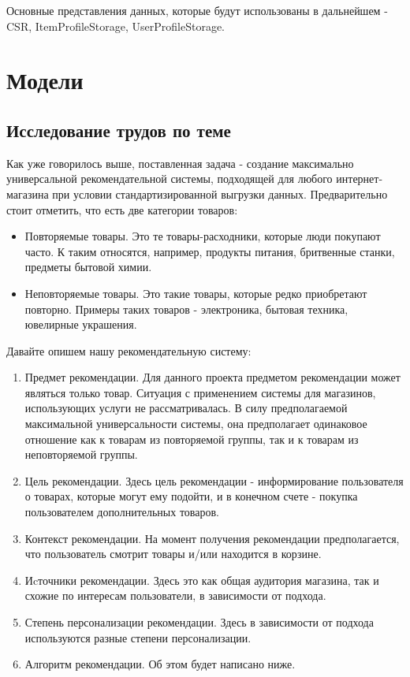 \documentclass[14pt]{mmcs_article}
\begin{document}
Основные представления данных, которые будут использованы в дальнейшем - CSR, ItemProfileStorage, UserProfileStorage.



\section{Модели}\label{dsfs}
\subsection{Исследование трудов по теме}
Как уже говорилось выше, поставленная задача - создание максимально универсальной рекомендательной системы, подходящей для любого интернет-магазина при условии стандартизированной выгрузки данных.
Предварительно стоит отметить, что есть две категории товаров:
\begin{itemize}
	\item Повторяемые товары. Это те товары-расходники, которые люди покупают часто. К таким относятся, например, продукты питания, бритвенные станки, предметы бытовой химии.
	\item  Неповторяемые товары. Это такие товары, которые редко приобретают повторно. Примеры таких товаров - электроника, бытовая техника, ювелирные украшения.
\end{itemize}
Давайте опишем нашу рекомендательную систему:
\begin{enumerate}
\item Предмет рекомендации. Для данного проекта предметом рекомендации может являться только товар. Ситуация с применением системы для магазинов, использующих услуги не рассматривалась. В силу предполагаемой максимальной универсальности системы, она предполагает одинаковое отношение как к товарам из повторяемой группы, так и к товарам из неповторяемой группы.
\item Цель рекомендации. Здесь цель рекомендации - информирование пользователя о товарах, которые могут ему подойти, и в конечном счете - покупка пользователем дополнительных товаров.
\item Контекст рекомендации. На момент получения рекомендации предполагается, что пользователь смотрит товары и/или находится в корзине.
\item Иcточники рекомендации. Здесь это как общая аудитория магазина, так и схожие по интересам пользователи, в зависимости от подхода.
\item Степень персонализации рекомендации. Здесь в зависимости от подхода используются разные степени персонализации.
\item Алгоритм рекомендации. Об этом будет написано ниже. 
\end{enumerate}
\end{document}
